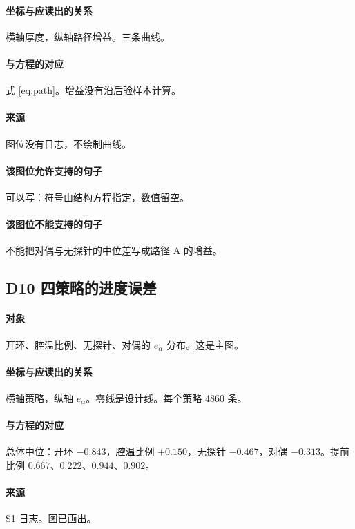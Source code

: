 \paragraph{坐标与应读出的关系}
横轴厚度，纵轴路径增益。三条曲线。

\paragraph{与方程的对应}
式 \eqref{eq:path}。增益没有沿后验样本计算。

\paragraph{来源}
图位没有日志，不绘制曲线。

\paragraph{该图位允许支持的句子}
可以写：符号由结构方程指定，数值留空。

\paragraph{该图位不能支持的句子}
不能把对偶与无探针的中位差写成路径 A 的增益。

\subsection{D10 四策略的进度误差}
\paragraph{对象}
开环、腔温比例、无探针、对偶的 $e_\alpha$ 分布。这是主图。

\paragraph{坐标与应读出的关系}
横轴策略，纵轴 $e_\alpha$。零线是设计线。每个策略 4860 条。

\paragraph{与方程的对应}
总体中位：开环 $-0.843$，腔温比例 $+0.150$，无探针 $-0.467$，对偶 $-0.313$。提前比例 $0.667$、$0.222$、$0.944$、$0.902$。

\paragraph{来源}
S1 日志。图已画出。

